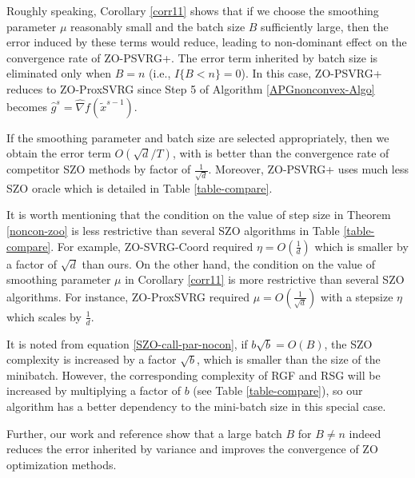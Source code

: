 \documentclass{article}
\theoremstyle{definition}
\theoremstyle{remark}
\begin{document}
Roughly speaking, Corollary \ref{corr11} shows  that if we choose the smoothing parameter $\mu$ reasonably small and the batch size $B$ sufficiently large, then the error induced by these terms would reduce, leading to non-dominant effect on the convergence rate of ZO-PSVRG+.
The error term inherited by batch size  is eliminated only when $B = n$  (i.e., $I\{B < n\} = 0$). In
this case, ZO-PSVRG+ reduces to ZO-ProxSVRG since Step 5 of Algorithm \ref{APGnonconvex-Algo} becomes $\hat{g}^s = \hat{\nabla} f(\widetilde{x}^{s-1})$. 

If the smoothing parameter and batch size are selected appropriately, then we obtain the error term $O(\sqrt{d}/T)$, with is better than the convergence rate of competitor SZO methods by factor of $\frac{1}{\sqrt{d}}$. Moreover, ZO-PSVRG+ uses much less SZO oracle which is detailed in Table \ref{table-compare}.

It is worth mentioning that the condition on the value of step size in Theorem \ref{noncon-zoo} is less restrictive than several SZO algorithms  in Table \ref{table-compare}. For example, ZO-SVRG-Coord required $\eta = O(\frac{1}{d})$ which is smaller by a factor of $\sqrt{d}$ than ours. {\color{Brown}On the other hand, the condition on the value of smoothing parameter $\mu$ in Corollary \ref{corr11} is more restrictive than several SZO algorithms. For instance, ZO-ProxSVRG required $\mu= O(\frac{1}{\sqrt{d}})$ with a stepsize $\eta$ which scales by $\frac{1}{d}$.}


{\color{Green}
It is noted from equation \eqref{SZO-call-par-nocon},  if ${b\sqrt{b}} = O(B)$, the SZO complexity is increased by a factor $\sqrt{b}$, which is smaller than the size of the minibatch. However, the corresponding complexity of RGF and RSG will be increased by multiplying
a factor of $b$ (see Table \ref{table-compare}), so our algorithm has a better dependency to the mini-batch size in this special case.

}
{\color{Brown}
Further, our work and reference \cite{} show that a large batch $B$  for $B \neq n$ indeed reduces the error inherited by variance and improves the convergence of ZO optimization methods.
}
\end{document}
